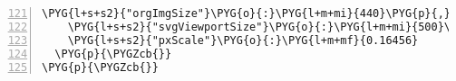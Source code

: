 \begin{Verbatim}[commandchars=\\\{\},numbers=left,firstnumber=121,stepnumber=1,codes={\catcode`\$=3\catcode`\^=7\catcode`\_=8}]
    \PYG{l+s+s2}{"orgImgSize"}\PYG{o}{:}\PYG{l+m+mi}{440}\PYG{p}{,}
    \PYG{l+s+s2}{"svgViewportSize"}\PYG{o}{:}\PYG{l+m+mi}{500}\PYG{p}{,}
    \PYG{l+s+s2}{"pxScale"}\PYG{o}{:}\PYG{l+m+mf}{0.16456}
  \PYG{p}{\PYGZcb{}}
\PYG{p}{\PYGZcb{}}
\end{Verbatim}

